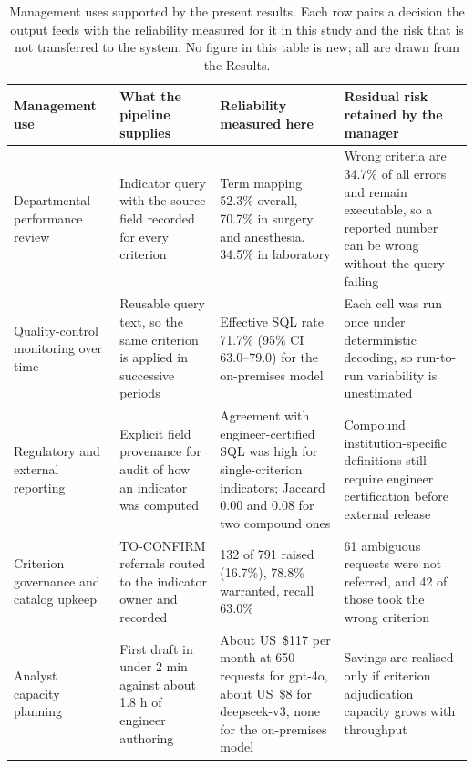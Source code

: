 \documentclass[10pt]{article}
\begin{document}
\begin{table}[!ht]
\caption{Management uses supported by the present results. Each row pairs a
decision the output feeds with the reliability measured for it in this study and
the risk that is not transferred to the system. No figure in this table is new;
all are drawn from the Results.}
\label{tab:mgmt}
\centering
\footnotesize
\setlength{\tabcolsep}{4pt}
\begin{tabular}{L{2.4cm}L{3.3cm}L{3.3cm}L{3.3cm}}
\toprule
Management use & What the pipeline supplies & Reliability measured here &
Residual risk retained by the manager\\
\midrule
Departmental performance review &
Indicator query with the source field recorded for every criterion &
Term mapping 52.3\% overall, 70.7\% in surgery and anesthesia, 34.5\% in
laboratory &
Wrong criteria are 34.7\% of all errors and remain executable, so a reported
number can be wrong without the query failing\\
\addlinespace
Quality-control monitoring over time &
Reusable query text, so the same criterion is applied in successive periods &
Effective SQL rate 71.7\% (95\% CI 63.0--79.0) for the on-premises model &
Each cell was run once under deterministic decoding, so run-to-run variability is
unestimated\\
\addlinespace
Regulatory and external reporting &
Explicit field provenance for audit of how an indicator was computed &
Agreement with engineer-certified SQL was high for single-criterion indicators;
Jaccard 0.00 and 0.08 for two compound ones &
Compound institution-specific definitions still require engineer certification
before external release\\
\addlinespace
Criterion governance and catalog upkeep &
TO-CONFIRM referrals routed to the indicator owner and recorded &
132 of 791 raised (16.7\%), 78.8\% warranted, recall 63.0\% &
61 ambiguous requests were not referred, and 42 of those took the wrong
criterion\\
\addlinespace
Analyst capacity planning &
First draft in under 2 min against about 1.8 h of engineer authoring &
About US~\$117 per month at 650 requests for gpt-4o, about US~\$8 for
deepseek-v3, none for the on-premises model &
Savings are realised only if criterion adjudication capacity grows with
throughput\\
\bottomrule
\end{tabular}
\end{table}
\end{document}
